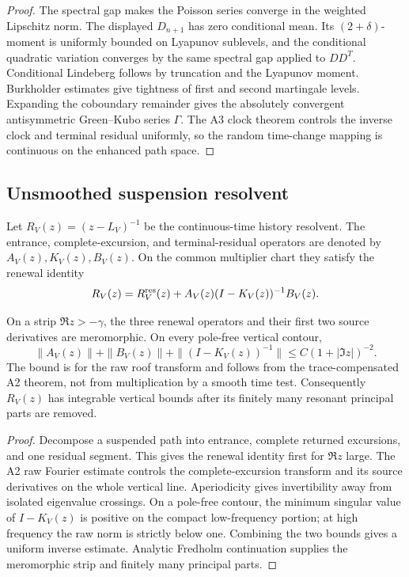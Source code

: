 \begin{proof}
The spectral gap makes the Poisson series converge in the weighted Lipschitz
norm.  The displayed \(D_{n+1}\) has zero conditional mean.  Its
\((2+\delta)\)-moment is uniformly bounded on Lyapunov sublevels, and the
conditional quadratic variation converges by the same spectral gap applied to
\(D D^T\).  Conditional Lindeberg follows by truncation and the Lyapunov
moment.  Burkholder estimates give tightness of first and second martingale
levels.  Expanding the coboundary remainder gives the absolutely convergent
antisymmetric Green--Kubo series \(\Gamma\).  The A3 clock theorem controls
the inverse clock and terminal residual uniformly, so the random time-change
mapping is continuous on the enhanced path space.
\end{proof}

\subsection{Unsmoothed suspension resolvent}

Let \(R_V(z)=(z-L_V)^{-1}\) be the continuous-time history resolvent.  The
entrance, complete-excursion, and terminal-residual operators are denoted by
\(A_V(z),K_V(z),B_V(z)\).  On the common multiplier chart they satisfy the
renewal identity
\[
 R_V(z)=R_V^{\rm res}(z)+A_V(z)(I-K_V(z))^{-1}B_V(z).
\]

\begin{theorem}
\label{thm:r16-a4-renewal}
On a strip \(\Re z>-\gamma\), the three renewal operators and their first two
source derivatives are meromorphic.  On every pole-free vertical contour,
\[
 \|A_V(z)\|+\|B_V(z)\|
 +\|(I-K_V(z))^{-1}\|
 \le C(1+|\Im z|)^{-2}.
\]
The bound is for the raw roof transform and follows from the
trace-compensated A2 theorem, not from multiplication by a smooth time test.
Consequently \(R_V(z)\) has integrable vertical bounds after its finitely many
resonant principal parts are removed.
\end{theorem}

\begin{proof}
Decompose a suspended path into entrance, complete returned excursions, and
one residual segment.  This gives the renewal identity first for \(\Re z\)
large.  The A2 raw Fourier estimate controls the complete-excursion transform
and its source derivatives on the whole vertical line.  Aperiodicity gives
invertibility away from isolated eigenvalue crossings.  On a pole-free
contour, the minimum singular value of \(I-K_V(z)\) is positive on the compact
low-frequency portion; at high frequency the raw norm is strictly below one.
Combining the two bounds gives a uniform inverse estimate.  Analytic Fredholm
continuation supplies the meromorphic strip and finitely many principal parts.
\end{proof}

